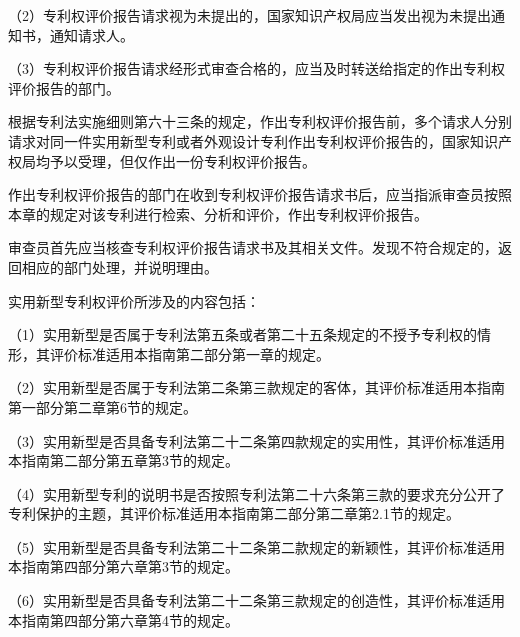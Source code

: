 {\setlength{\parindent}{17.1bp}（2）专利权评价报告请求视为未提出的，国家知识产权局应当发出视为未提出通知书，通知请求人。\par}

{\setlength{\parindent}{17.1bp}（3）专利权评价报告请求经形式审查合格的，应当及时转送给指定的作出专利权评价报告的部门。\par}

根据专利法实施细则第六十三条的规定，作出专利权评价报告前，多个请求人分别请求对同一件实用新型专利或者外观设计专利作出专利权评价报告的，国家知识产权局均予以受理，但仅作出一份专利权评价报告。

作出专利权评价报告的部门在收到专利权评价报告请求书后，应当指派审查员按照本章的规定对该专利进行检索、分析和评价，作出专利权评价报告。

审查员首先应当核查专利权评价报告请求书及其相关文件。发现不符合规定的，返回相应的部门处理，并说明理由。

实用新型专利权评价所涉及的内容包括：

{\setlength{\parindent}{17.1bp}（1）实用新型是否属于专利法第五条或者第二十五条规定的不授予专利权的情形，其评价标准适用本指南第二部分第一章的规定。\par}

{\setlength{\parindent}{17.1bp}（2）实用新型是否属于专利法第二条第三款规定的客体，其评价标准适用本指南第一部分第二章第6节的规定。\par}

{\setlength{\parindent}{17.1bp}（3）实用新型是否具备专利法第二十二条第四款规定的实用性，其评价标准适用本指南第二部分第五章第3节的规定。\par}

{\setlength{\parindent}{17.1bp}（4）实用新型专利的说明书是否按照专利法第二十六条第三款的要求充分公开了专利保护的主题，其评价标准适用本指南第二部分第二章第2.1节的规定。\par}

{\setlength{\parindent}{17.1bp}（5）实用新型是否具备专利法第二十二条第二款规定的新颖性，其评价标准适用本指南第四部分第六章第3节的规定。\par}

{\setlength{\parindent}{17.1bp}（6）实用新型是否具备专利法第二十二条第三款规定的创造性，其评价标准适用本指南第四部分第六章第4节的规定。\par}

